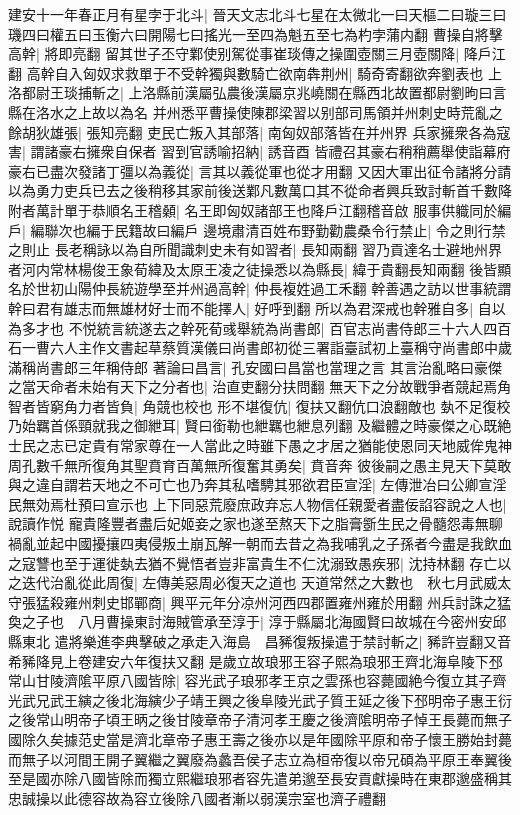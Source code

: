 建安十一年春正月有星孛于北斗|{
	晉天文志北斗七星在太微北一曰天樞二曰璇三曰璣四曰權五曰玉衡六曰開陽七曰搖光一至四為魁五至七為杓孛蒲内翻}
曹操自將擊高幹|{
	將即亮翻}
留其世子丕守鄴使别駕從事崔琰傳之操圍壺關三月壺關降|{
	降戶江翻}
高幹自入匈奴求救單于不受幹獨與數騎亡欲南犇荆州|{
	騎奇寄翻欲奔劉表也}
上洛都尉王琰捕斬之|{
	上洛縣前漢屬弘農後漢屬京兆嶢關在縣西北故置都尉劉昫曰言縣在洛水之上故以為名}
并州悉平曹操使陳郡梁習以别部司馬領并州刺史時荒亂之餘胡狄雄張|{
	張知亮翻}
吏民亡叛入其部落|{
	南匈奴部落皆在并州界}
兵家擁衆各為寇害|{
	謂諸豪右擁衆自保者}
習到官誘喻招納|{
	誘音酉}
皆禮召其豪右稍稍薦舉使詣幕府豪右已盡次發諸丁彊以為義從|{
	言其以義從軍也從才用翻}
又因大軍出征令諸將分請以為勇力吏兵已去之後稍移其家前後送鄴凡數萬口其不從命者興兵致討斬首千數降附者萬計單于恭順名王稽顙|{
	名王即匈奴諸部王也降戶江翻稽音啟}
服事供軄同於編戶|{
	編聯次也編于民籍故曰編戶}
邊境肅清百姓布野勤勸農桑令行禁止|{
	令之則行禁之則止}
長老稱詠以為自所聞識刺史未有如習者|{
	長知兩翻}
習乃貢達名士避地州界者河内常林楊俊王象荀緯及太原王凌之徒操悉以為縣長|{
	緯于貴翻長知兩翻}
後皆顯名於世初山陽仲長統遊學至并州過高幹|{
	仲長複姓過工禾翻}
幹善遇之訪以世事統謂幹曰君有雄志而無雄材好士而不能擇人|{
	好呼到翻}
所以為君深戒也幹雅自多|{
	自以為多才也}
不悦統言統遂去之幹死荀彧舉統為尚書郎|{
	百官志尚書侍郎三十六人四百石一曹六人主作文書起草蔡質漢儀曰尚書郎初從三署詣臺試初上臺稱守尚書郎中歲滿稱尚書郎三年稱侍郎}
著論曰昌言|{
	孔安國曰昌當也當理之言}
其言治亂略曰豪傑之當天命者未始有天下之分者也|{
	治直吏翻分扶問翻}
無天下之分故戰爭者競起焉角智者皆窮角力者皆負|{
	角競也校也}
形不堪復伉|{
	復扶又翻伉口浪翻敵也}
埶不足復校乃始羈首係頸就我之御紲耳|{
	賢曰銜勒也紲羈也紲息列翻}
及繼體之時豪傑之心既絶士民之志已定貴有常家尊在一人當此之時雖下愚之才居之猶能使恩同天地威侔鬼神周孔數千無所復角其聖賁育百萬無所復奮其勇矣|{
	賁音奔}
彼後嗣之愚主見天下莫敢與之違自謂若天地之不可亡也乃奔其私嗜騁其邪欲君臣宣淫|{
	左傳泄冶曰公卿宣淫民無効焉杜預曰宣示也}
上下同惡荒廢庶政弃忘人物信任親愛者盡佞諂容說之人也|{
	說讀作悦}
寵貴隆豐者盡后妃姬妾之家也遂至熬天下之脂膏斵生民之骨髓怨毒無聊禍亂並起中國擾攘四夷侵叛土崩瓦解一朝而去昔之為我哺乳之子孫者今盡是我飲血之寇讐也至于運徙埶去猶不覺悟者豈非富貴生不仁沈溺致愚疾邪|{
	沈持林翻}
存亡以之迭代治亂從此周復|{
	左傳美惡周必復天之道也}
天道常然之大數也　秋七月武威太守張猛殺雍州刺史邯鄲商|{
	興平元年分凉州河西四郡置雍州雍於用翻}
州兵討誅之猛奐之子也　八月曹操東討海賊管承至淳于|{
	淳于縣屬北海國賢曰故城在今密州安邱縣東北}
遣將樂進李典擊破之承走入海島　昌豨復叛操遣于禁討斬之|{
	豨許豈翻又音希豨降見上卷建安六年復扶又翻}
是歲立故琅邪王容子熙為琅邪王齊北海阜陵下邳常山甘陵濟隂平原八國皆除|{
	容光武子琅邪孝王京之雲孫也容薨國絶今復立其子齊光武兄武王縯之後北海縯少子靖王興之後阜陵光武子質王延之後下邳明帝子惠王衍之後常山明帝子頃王昞之後甘陵章帝子清河孝王慶之後濟隂明帝子悼王長薨而無子國除久矣據范史當是濟北章帝子惠王壽之後亦以是年國除平原和帝子懷王勝始封薨而無子以河間王開子翼繼之翼廢為蠡吾侯子志立為桓帝復以帝兄碩為平原王奉翼後至是國亦除八國皆除而獨立熙繼琅邪者容先遣弟邈至長安貢獻操時在東郡邈盛稱其忠誠操以此德容故為容立後除八國者漸以弱漢宗室也濟子禮翻}
